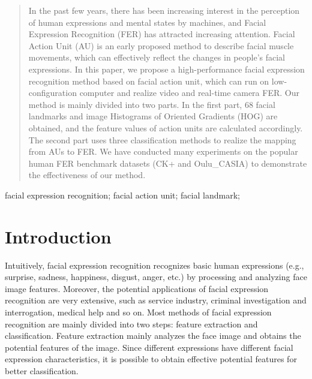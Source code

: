 \documentclass[10pt, conference, compsocconf]{IEEEtran}
\begin{document}




\maketitle


\begin{abstract}
In the past few years, there has been increasing interest in the perception of human expressions and mental states by machines, and Facial Expression Recognition (FER) has attracted increasing attention. Facial Action Unit (AU) is an early proposed method to describe facial muscle movements, which can effectively reflect the changes in people's facial expressions. In this paper, we propose a high-performance facial expression recognition method based on facial action unit, which can run on low-configuration computer and realize video and real-time camera FER. Our method is mainly divided into two parts. In the first part, 68 facial landmarks and image Histograms of Oriented Gradients (HOG) are obtained, and the feature values of action units are calculated accordingly. The second part uses three classification methods to realize the mapping from AUs to FER. We have conducted many experiments on the popular human FER benchmark datasets (CK+ and Oulu\_CASIA) to demonstrate the effectiveness of our method.
\end{abstract}

\begin{IEEEkeywords}
facial expression recognition; facial action unit; facial landmark;

\end{IEEEkeywords}


%
\IEEEpeerreviewmaketitle



\section{Introduction}
Intuitively, facial expression recognition recognizes basic human expressions\cite{Peter2009Computation} (e.g., surprise, sadness, happiness, disgust, anger, etc.) by processing and analyzing face image features. Moreover, the potential applications of facial expression recognition are very extensive, such as service industry, criminal investigation and interrogation, medical help\cite{Girard2013Social} and so on. Most methods of facial expression recognition are mainly divided into two steps: feature extraction and classification. Feature extraction mainly analyzes the face image and obtains the potential features of the image. Since different expressions have different facial expression characteristics, it is possible to obtain effective potential features for better classification.
\end{document}
